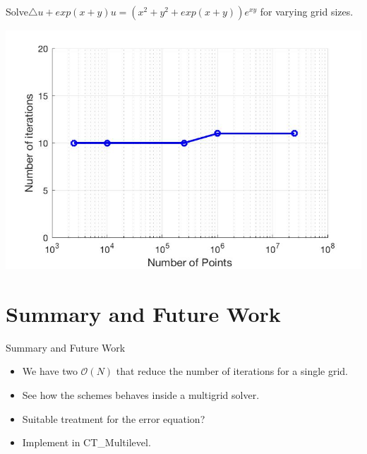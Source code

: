 \documentclass{beamer}
\begin{document}
\begin{frame}
Solve$\triangle u+exp(x+y)u=(x^2+y^2+exp(x+y))e^{xy}$ for varying grid sizes.
\begin{center}
     \includegraphics[scale=0.3]{iterations.jpg}
 \end{center}

\end{frame}

\section{Summary and Future Work}

\begin{frame}{Summary and Future Work}
\begin{itemize}
    \item We have two $\mathcal{O}(N)$ that reduce the number of iterations for a single grid.
    \item See how the schemes behaves inside a multigrid solver.
    \item Suitable treatment for the error equation?
    \item Implement in CT\_Multilevel.
\end{itemize}

\end{frame}

\end{document}
